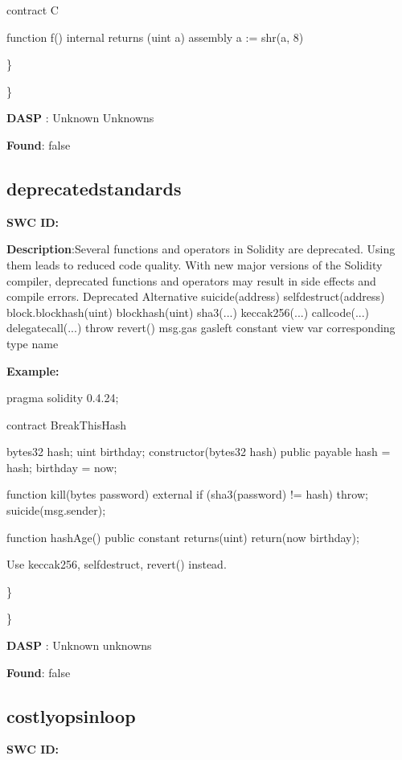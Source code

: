 \documentclass{article}
\begin{document}
contract C {
  function f() internal returns (uint a) {
    assembly {
        a := shr(a, 8)
    }
}

\} 

\} 

\textbf{DASP} : Unknown Unknowns

\textbf{Found}: false

\subsection{deprecated\textunderscore standards} 
\textbf{SWC \textunderscore ID:} 

\textbf{Description}:Several functions and operators in Solidity are deprecated. Using them leads to reduced code quality. With new major versions of the Solidity compiler, deprecated functions and operators may result in side effects and compile errors.
  Deprecated              Alternative
  suicide(address)        selfdestruct(address)
  block.blockhash(uint)   blockhash(uint)
  sha3(...)               keccak256(...)
  callcode(...)           delegatecall(...)
  throw                   revert()
  msg.gas                 gasleft
  constant                view
  var                     corresponding type name


\textbf{Example:} 

pragma solidity 0.4.24;

contract BreakThisHash {
    bytes32 hash;
    uint birthday;
    constructor(bytes32 \textunderscore hash) public payable {
        hash = \textunderscore hash;
        birthday = now;
    }

    function kill(bytes password) external {
        if (sha3(password) != hash) {
            throw;
        }
        suicide(msg.sender);
    }

    function hashAge() public constant returns(uint) {
        return(now \textendash  birthday);
    }
}

Use keccak256, selfdestruct, revert() instead.

\} 

\} 

\textbf{DASP} : Unknown unknowns

\textbf{Found}: false

\subsection{costly\textunderscore ops\textunderscore in\textunderscore loop} 
\textbf{SWC \textunderscore ID:} 

}
\end{document}
